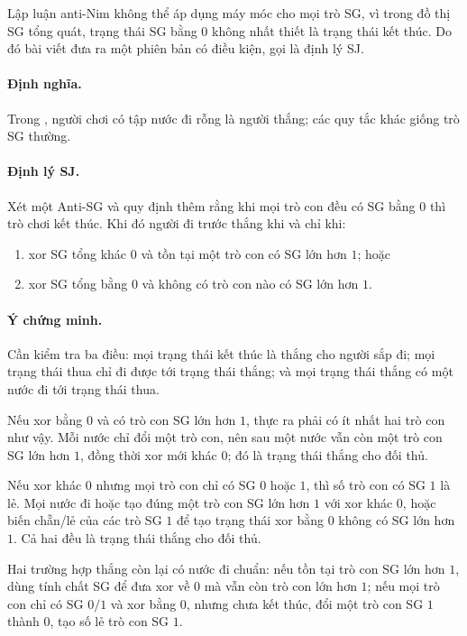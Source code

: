 \documentclass[11pt]{article}
\begin{document}
Lập luận anti-Nim không thể áp dụng máy móc cho mọi trò SG, vì trong đồ thị
SG tổng quát, trạng thái SG bằng \(0\) không nhất thiết là trạng thái kết thúc.
Do đó bài viết đưa ra một phiên bản có điều kiện, gọi là định lý SJ.

\paragraph{Định nghĩa.}
Trong , người chơi có tập nước đi rỗng là người thắng; các quy
tắc khác giống trò SG thường.

\paragraph{Định lý SJ.}
Xét một Anti-SG và quy định thêm rằng khi mọi trò con đều có SG bằng \(0\) thì
trò chơi kết thúc. Khi đó người đi trước thắng khi và chỉ khi:
\begin{enumerate}
  \item xor SG tổng khác \(0\) và tồn tại một trò con có SG lớn hơn \(1\); hoặc
  \item xor SG tổng bằng \(0\) và không có trò con nào có SG lớn hơn \(1\).
\end{enumerate}

\paragraph{Ý chứng minh.}
Cần kiểm tra ba điều: mọi trạng thái kết thúc là thắng cho người sắp đi; mọi
trạng thái thua chỉ đi được tới trạng thái thắng; và mọi trạng thái thắng có
một nước đi tới trạng thái thua.

Nếu xor bằng \(0\) và có trò con SG lớn hơn \(1\), thực ra phải có ít nhất hai
trò con như vậy. Mỗi nước chỉ đổi một trò con, nên sau một nước vẫn còn một
trò con SG lớn hơn \(1\), đồng thời xor mới khác \(0\); đó là trạng thái thắng
cho đối thủ.

Nếu xor khác \(0\) nhưng mọi trò con chỉ có SG \(0\) hoặc \(1\), thì số trò
con có SG \(1\) là lẻ. Mọi nước đi hoặc tạo đúng một trò con SG lớn hơn \(1\)
với xor khác \(0\), hoặc biến chẵn/lẻ của các trò SG \(1\) để tạo trạng thái
xor bằng \(0\) không có SG lớn hơn \(1\). Cả hai đều là trạng thái thắng cho
đối thủ.

Hai trường hợp thắng còn lại có nước đi chuẩn: nếu tồn tại trò con SG lớn hơn
\(1\), dùng tính chất SG để đưa xor về \(0\) mà vẫn còn trò con lớn hơn \(1\);
nếu mọi trò con chỉ có SG \(0/1\) và xor bằng \(0\), nhưng chưa kết thúc, đổi
một trò con SG \(1\) thành \(0\), tạo số lẻ trò con SG \(1\).
\end{document}
